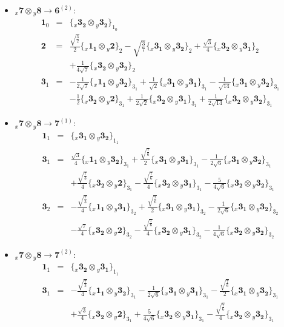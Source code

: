 \documentclass[english]{article}
\newcommand{\rep}[1]{\mathbf{#1}}
\newcommand{\repx}[2]{{}_{#2}\mathbf{#1}}
\newcommand{\subcg}[3]{\big\{ \repx{#1}{x}\otimes\repx{#2}{y}\big\}^{}_{#3}}
\begin{document}
\begin{itemize}
\item $\repx{7}{x}\otimes\repx{8}{y}\to\rep{6}^{(2)}$:
\begin{eqnarray*}
\rep{1}_{0} &=& \subcg{3_{2}}{3_{2}}{1_{0}}
\\
\rep{2} &=& \frac{\sqrt{\frac{3}{2}}}{2}\subcg{1_{1}}{2}{2}-\sqrt{\frac{3}{7}}\subcg{3_{1}}{3_{2}}{2}+\frac{\sqrt{3}}{4}\subcg{3_{2}}{3_{1}}{2} \\ 
 & & +\frac{1}{4 \sqrt{7}}\subcg{3_{2}}{3_{2}}{2}
\\
\rep{3}_{1} &=& -\frac{1}{2 \sqrt{7}}\subcg{1_{1}}{3_{2}}{3_{1}}+\frac{1}{\sqrt{2}}\subcg{3_{1}}{3_{1}}{3_{1}}-\frac{1}{\sqrt{14}}\subcg{3_{1}}{3_{2}}{3_{1}} \\ 
 & & -\frac{1}{2}\subcg{3_{2}}{2}{3_{1}}+\frac{1}{2 \sqrt{2}}\subcg{3_{2}}{3_{1}}{3_{1}}+\frac{1}{2 \sqrt{14}}\subcg{3_{2}}{3_{2}}{3_{1}}
\end{eqnarray*}
\item $\repx{7}{x}\otimes\repx{8}{y}\to\rep{7}^{(1)}$:
\begin{eqnarray*}
\rep{1}_{1} &=& \subcg{3_{1}}{3_{2}}{1_{1}}
\\
\rep{3}_{1} &=& \frac{\sqrt{3}}{4}\subcg{1_{1}}{3_{2}}{3_{1}}+\frac{\sqrt{\frac{7}{6}}}{2}\subcg{3_{1}}{3_{1}}{3_{1}}-\frac{1}{2 \sqrt{6}}\subcg{3_{1}}{3_{2}}{3_{1}} \\ 
 & & +\frac{\sqrt{\frac{7}{3}}}{4}\subcg{3_{2}}{2}{3_{1}}-\frac{\sqrt{\frac{7}{6}}}{4}\subcg{3_{2}}{3_{1}}{3_{1}}-\frac{5}{4 \sqrt{6}}\subcg{3_{2}}{3_{2}}{3_{1}}
\\
\rep{3}_{2} &=& -\frac{\sqrt{\frac{7}{3}}}{4}\subcg{1_{1}}{3_{1}}{3_{2}}+\frac{\sqrt{\frac{7}{6}}}{2}\subcg{3_{1}}{3_{1}}{3_{2}}-\frac{1}{2 \sqrt{6}}\subcg{3_{1}}{3_{2}}{3_{2}} \\ 
 & & -\frac{\sqrt{7}}{4}\subcg{3_{2}}{2}{3_{2}}-\frac{\sqrt{\frac{7}{6}}}{4}\subcg{3_{2}}{3_{1}}{3_{2}}-\frac{1}{4 \sqrt{6}}\subcg{3_{2}}{3_{2}}{3_{2}}
\end{eqnarray*}
\item $\repx{7}{x}\otimes\repx{8}{y}\to\rep{7}^{(2)}$:
\begin{eqnarray*}
\rep{1}_{1} &=& \subcg{3_{2}}{3_{1}}{1_{1}}
\\
\rep{3}_{1} &=& -\frac{\sqrt{\frac{7}{3}}}{4}\subcg{1_{1}}{3_{2}}{3_{1}}-\frac{1}{2 \sqrt{6}}\subcg{3_{1}}{3_{1}}{3_{1}}-\frac{\sqrt{\frac{7}{6}}}{2}\subcg{3_{1}}{3_{2}}{3_{1}} \\ 
 & & +\frac{\sqrt{3}}{4}\subcg{3_{2}}{2}{3_{1}}+\frac{5}{4 \sqrt{6}}\subcg{3_{2}}{3_{1}}{3_{1}}-\frac{\sqrt{\frac{7}{6}}}{4}\subcg{3_{2}}{3_{2}}{3_{1}}

\end{eqnarray*}
\end{itemize}
\end{document}
